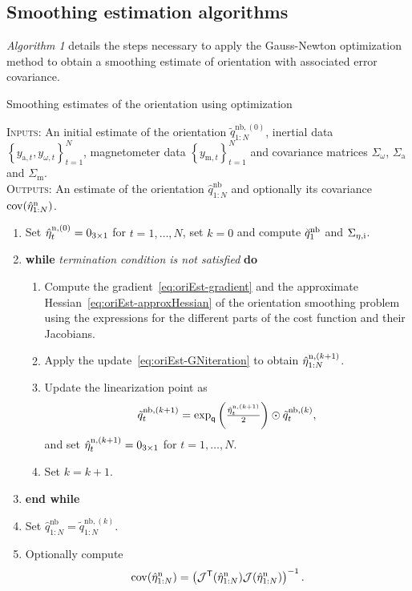 \documentclass{article}
\begin{document}
\subsection{Smoothing estimation algorithms}

\textit{Algorithm 1} details the steps necessary to apply the Gauss-Newton optimization method to obtain
a smoothing estimate of orientation with associated error covariance.

\begin{algorithm}[ht]
  \caption{\textsf{Smoothing estimates of the orientation using optimization}}
  \label{alg:oriEst-smoothingOpt}
  \small
  \textsc{Inputs:} An initial estimate of the orientation $\tilde{q}^{\text{nb},(0)}_{1:N}$, inertial data $\left\{ y_{\text{a},t}, y_{\omega,t} \right\}_{t=1}^N$, magnetometer data $\left\{ y_{\text{m},t}\right\}_{t=1}^N$ and covariance matrices $\Sigma_\omega$, $\Sigma_\text{a}$ and $\Sigma_\text{m}$. \\
  \textsc{Outputs:} An estimate of the orientation $\hat{q}^\text{nb}_{1:N}$ and optionally its covariance $\operatorname{cov} (\hat{\eta}^\text{n}_{1:N})$.
  \algrule[.4pt]
  \begin{enumerate}
  \item Set $\hat {\eta}_t^{\text{n},(0)} = 0_{3 \times 1}$ for $t = 1, \hdots, N$, set $k = 0$ and compute $\breve{q}_1^\text{nb}$ and $\Sigma_{\eta,\text{i}}$.
  \item \textbf{while} \textit{termination condition is not satisfied} \textbf{do}
  \begin{enumerate}
  \item Compute the gradient~\eqref{eq:oriEst-gradient} and the approximate Hessian~\eqref{eq:oriEst-approxHessian} of the orientation smoothing problem using the expressions for the different parts of the cost function and their Jacobians.
  \item Apply the update~\eqref{eq:oriEst-GNiteration} to obtain $\hat {\eta}_{1:N}^{\text{n},(k+1)}$.
  \item Update the linearization point as
  \begin{align}
  \tilde q^{\text{nb},(k+1)}_t = \exp_\mathsf{q} \left( \tfrac{\hat{\eta}_t^{\text{n},(k+1)}}{2} \right) \odot \tilde{q}^{\text{nb},(k)}_t,
  \label{eq:oriEst-relinSmoothing}
  \end{align}
  and set $\hat {\eta}_t^{\text{n},(k+1)} = 0_{3 \times 1}$ for $t = 1, \hdots, N$.
  \item Set $k = k+1$.
  \end{enumerate}
  \item[] \textbf{end while}
  \item Set $\hat{q}^\text{nb}_{1:N} = \tilde{q}^{\text{nb},(k)}_{1:N}$.
  \item Optionally compute
  \begin{align}
  \operatorname{cov} (\hat{\eta}^\text{n}_{1:N}) = \left( \mathcal{J}^{\mathsf{T}}(\hat{\eta}^\text{n}_{1:N}) \mathcal{J} (\hat{\eta}^\text{n}_{1:N}) \right)^{-1}.
  \end{align}
  \end{enumerate}
  \normalsize
\end{algorithm}
\end{document}
